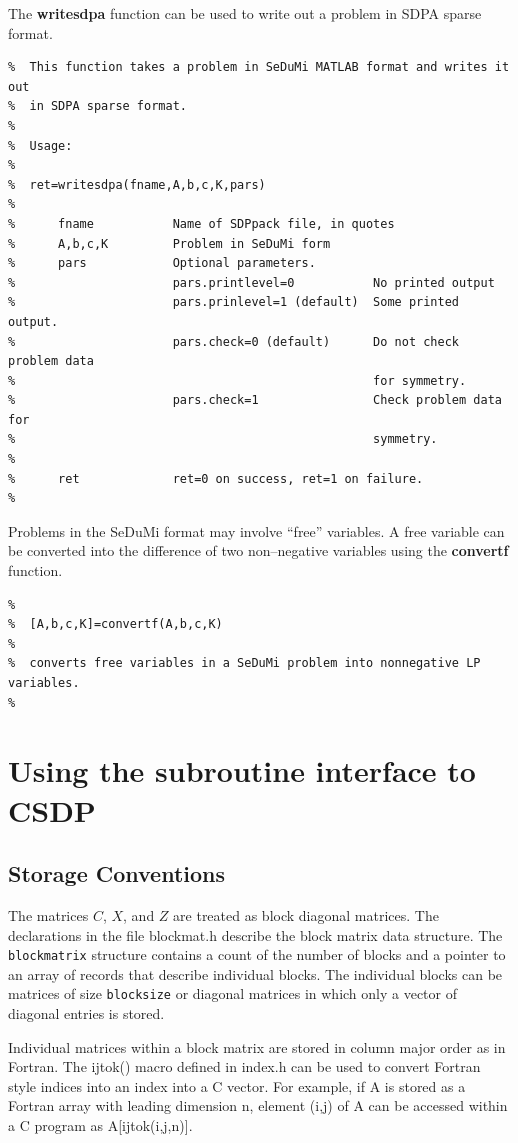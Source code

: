 \documentclass{article}
\begin{document}
The {\bf writesdpa} function can be used to write out a problem in SDPA
sparse format.

\begin{verbatim}
%  This function takes a problem in SeDuMi MATLAB format and writes it out 
%  in SDPA sparse format.  
%
%  Usage:
%
%  ret=writesdpa(fname,A,b,c,K,pars)
%
%      fname           Name of SDPpack file, in quotes
%      A,b,c,K         Problem in SeDuMi form
%      pars            Optional parameters.
%                      pars.printlevel=0           No printed output  
%                      pars.prinlevel=1 (default)  Some printed output.
%                      pars.check=0 (default)      Do not check problem data
%                                                  for symmetry.
%                      pars.check=1                Check problem data for
%                                                  symmetry.       
%      
%      ret             ret=0 on success, ret=1 on failure.
%
\end{verbatim}

Problems in the SeDuMi format may involve ``free'' variables.  A free variable
can be converted into the difference of two non--negative variables using the
{\bf convertf} function.

\begin{verbatim}
% 
%  [A,b,c,K]=convertf(A,b,c,K)
% 
%  converts free variables in a SeDuMi problem into nonnegative LP variables.
% 
\end{verbatim}
\section*{Using the subroutine interface to CSDP}
\subsection*{Storage Conventions}
The matrices $C$, $X$, and $Z$ are treated as block diagonal matrices.
The declarations in the file blockmat.h describe the block matrix
data structure.  The {\tt blockmatrix} structure contains a count of
the number of blocks and a pointer to an array of records that 
describe individual blocks.  The individual blocks can be matrices
of size {\tt blocksize} or diagonal matrices in which only a vector
of diagonal entries is stored.  

Individual matrices within a block matrix are stored in column major
order as in Fortran.  The ijtok() macro defined in index.h can be used
to convert Fortran style indices into an index into a C vector.  For
example, if A is stored as a Fortran array with leading dimension
n, element (i,j) of A can be accessed within a C program as
A[ijtok(i,j,n)].
\end{document}
